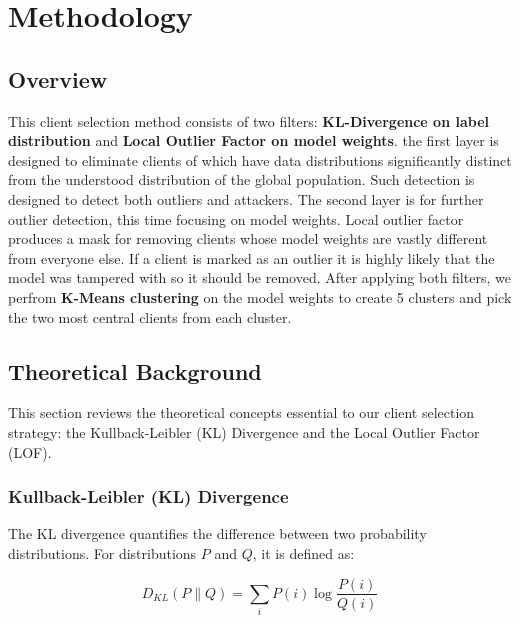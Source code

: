 \chapter{Methodology}
\section{Overview}
This client selection method consists of two filters:
\textbf{KL-Divergence on label distribution} and
\textbf{Local Outlier Factor on model weights}.
the first layer is designed to eliminate clients of which have data
distributions significantly distinct from the understood distribution of the
global population. Such detection is designed to detect both outliers and
attackers. The second layer is for further outlier detection, this time
focusing on model weights.
Local outlier factor produces a mask for removing clients whose model weights
are vastly different from everyone else. If a client is marked as an outlier it
is highly likely that the model was tampered with so it should be removed.
After applying both filters, we perfrom \textbf{K-Means clustering} on the
model weights to create 5 clusters and pick the two most central clients from
each cluster.

\section{Theoretical Background}

This section reviews the theoretical concepts essential to our client selection
strategy: the Kullback-Leibler (KL) Divergence and the Local Outlier Factor
(LOF).

\subsection{Kullback-Leibler (KL) Divergence}
The KL divergence quantifies the difference between two probability
distributions. For distributions \(P\) and \(Q\), it is defined as:

\[
    D_{KL}(P \parallel Q) = \sum_{i} P(i) \log\frac{P(i)}{Q(i)}
\]

